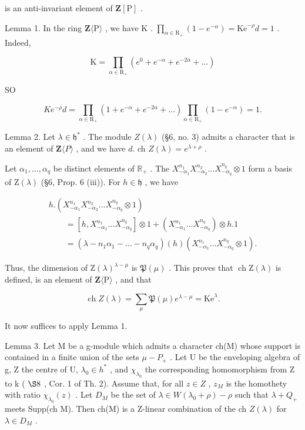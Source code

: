 is an anti-invariant element of \(\mathbf{Z}[\mathrm{P}]\) .

Lemma 1. In the ring \(\mathbf{Z}\langle \mathrm{P}\rangle\) , we have \(\mathrm{K}\) . \(\prod_{\alpha \in \mathrm{R}_{+}}(1 - e^{-\alpha}) = \mathrm{Ke}^{-\rho}d = 1\) . Indeed,

\[
\mathrm{K} = \prod_ {\alpha \in \mathrm{R} _ {+}} \left(e ^ {0} + e ^ {- \alpha} + e ^ {- 2 \alpha} + \dots\right)
\]

SO

\[
K e ^ {- \rho} d = \prod_ {\alpha \in \mathrm{R} _ {+}} \left(1 + e ^ {- \alpha} + e ^ {- 2 \alpha} + \dots\right) \prod_ {\alpha \in \mathrm{R} _ {+}} \left(1 - e ^ {- \alpha}\right) = 1.
\]

Lemma 2. Let \(\lambda \in \mathfrak{h}^*\) . The module \(Z(\lambda)\) (§6, no. 3) admits a character that is an element of \(\mathbf{Z}\langle P\rangle\) , and we have \(d.\) ch \(Z(\lambda) = e^{\lambda + \rho}\) .

Let \(\alpha_{1},\ldots ,\alpha_{q}\) be distinct elements of \(\mathbb{R}_+\) . The \(X_{-\alpha_1}^{n_1}X_{-\alpha_2}^{n_2}\dots X_{-\alpha_q}^{n_q}\otimes 1\) form a basis of \(\mathrm{Z}(\lambda)\) (§6, Prop. 6 (iii)). For \(h\in \mathfrak{h}\) , we have

\[
\begin{array}{l} h. (X _ {- \alpha_ {1}} ^ {n _ {1}} X _ {- \alpha_ {2}} ^ {n _ {2}} \ldots X _ {- \alpha_ {q}} ^ {n _ {q}} \otimes 1) \\ \qquad = [ h, X _ {- \alpha_ {1}} ^ {n _ {1}} \ldots X _ {- \alpha_ {q}} ^ {n _ {q}} ] \otimes 1 + (X _ {- \alpha_ {1}} ^ {n _ {1}} \ldots X _ {- \alpha_ {q}} ^ {n _ {q}}) \otimes h. 1 \\ \qquad = (\lambda - n _ {1} \alpha_ {1} - \dots - n _ {q} \alpha_ {q}) (h) (X _ {- \alpha_ {1}} ^ {n _ {1}} \ldots X _ {- \alpha_ {q}} ^ {n _ {q}} \otimes 1). \end{array}
\]

Thus, the dimension of \(\mathrm{Z}(\lambda)^{\lambda - \mu}\) is \(\mathfrak{P}(\mu)\) . This proves that \(\operatorname{ch} \mathrm{Z}(\lambda)\) is defined, is an element of \(\mathbf{Z}\langle \mathrm{P} \rangle\) , and that

\[
\operatorname{ch} Z (\lambda) = \sum_ {\mu} \mathfrak {P} (\mu) e ^ {\lambda - \mu} = \mathrm{Ke} ^ {\lambda}.
\]

It now suffices to apply Lemma 1.

Lemma 3. Let M be a g-module which admits a character ch(M) whose support is contained in a finite union of the sets \(\mu-P_{+}\) . Let U be the enveloping algebra of g, Z the centre of U, \(\lambda_{0}\in h^{*}\) , and \(\chi_{\lambda_{0}}\) the corresponding homomorphism from Z to k ( \(\S8\) , Cor. 1 of Th. 2). Assume that, for all \(z\in Z\) , \(z_{M}\) is the homothety with ratio \(\chi_{\lambda_{0}}(z)\) . Let \(D_{M}\) be the set of \(\lambda\in W(\lambda_{0}+\rho)-\rho\) such that \(\lambda+Q_{+}\) meets Supp(ch M). Then ch(M) is a Z-linear combination of the ch \(Z(\lambda)\) for \(\lambda\in D_{M}\) .

